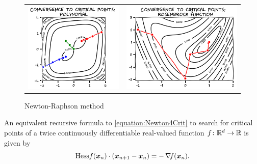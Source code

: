 \begin{figure}[ht!]
\begin{tabular}{cc}
\includegraphics[width=0.45\linewidth]{images/convergenceNewton.png} &
\includegraphics[width=0.55\linewidth]{images/convergenceNewtonRosenbrock.png} 
\end{tabular}
\caption{Newton-Raphson method}
\label{figure:NewtonConvergence}
\end{figure}

\begin{remark}
An equivalent recursive formula to \eqref{equation:Newton4Crit} to search for critical points of a twice continuously differentiable real-valued function $f \colon \mathbb{R}^d \to \mathbb{R}$ is given by
\begin{equation}\index{Newton-Raphson method}\index{Newton-Raphson method!recursive formula}\index{Newton-Raphson method!iteration}
\Hess{f}(\x_n) \cdot (\x_{n+1}-\x_n) = -\gradient{f}(\x_n).
\end{equation}
\end{remark}


